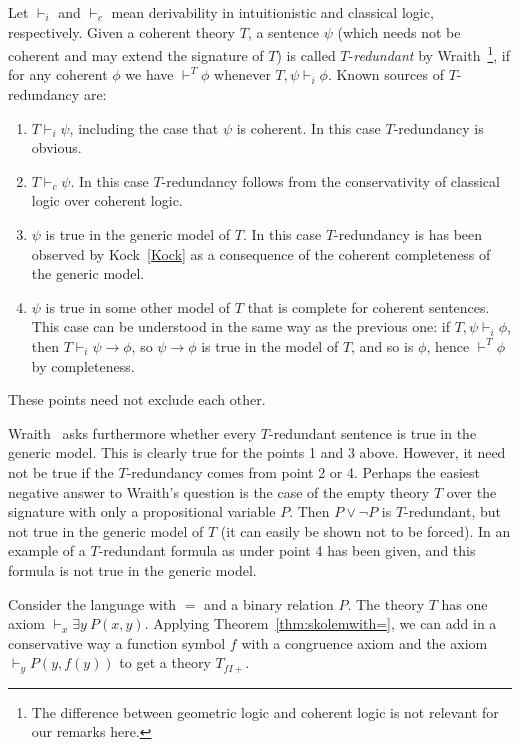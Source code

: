 \documentclass[10pt,a4paper]{article}
\begin{document}
Let $\vdash_i$ and $\vdash_c$ mean derivability in intuitionistic and classical logic,
respectively. Given a coherent theory $T$, a sentence $\psi$ 
(which needs not be coherent and may extend the signature of $T$)
is called $T$-\emph{redundant} by
Wraith~\cite[p. 336]{Wraith}\footnote{The difference
between geometric logic and coherent logic is not relevant for our remarks here.},
if for any coherent $\phi$ we have
$\vdash^T \phi$ whenever $T,\psi \vdash_i \phi$.
Known sources of $T$-redundancy are:
\begin{enumerate}
\item $T \vdash_i \psi$, including the case that $\psi$ is coherent.
In this case $T$-redundancy is obvious.
\item $T \vdash_c \psi$. In this case $T$-redundancy follows from the conservativity
of classical logic over coherent logic.
\item $\psi$ is true in the generic model of $T$. In this case $T$-redundancy is
has been observed by Kock~\ref{Kock} as a consequence of the coherent 
completeness of the generic model.
\item $\psi$ is true in some other model of $T$ that is complete for coherent 
sentences. This case can be understood in the same way as the previous one: 
if $T,\psi \vdash_i \phi$, then $T \vdash_i \psi\to\phi$, so $\psi\to\phi$ is true in
the model of $T$, and so is $\phi$, hence $\vdash^{T} \phi$ by completeness.
\end{enumerate}
These points need not exclude each other.

Wraith~\cite[p. 336]{Wraith} asks furthermore whether every $T$-redundant
sentence is true in the generic model. This is clearly true for the points 1 and 3 above.
However, it need not be true if the $T$-redundancy comes from point 2 or 4.
Perhaps the easiest negative answer to Wraith's question is the case of
the empty theory $T$ over the signature with only a propositional variable $P$.
Then $P\lor\neg P$ is $T$-redundant, but not true in the generic model of $T$
(it can easily be shown not to be forced). In \cite{BBC18} an example of
a $T$-redundant formula as under point 4 has been given, and this formula is
not true in the generic model.

Consider the language with $=$ and a binary relation $P$. The theory $T$ has one axiom
$\vdash_x \exists y~P(x,y)$. Applying Theorem~\ref{thm:skolemwith=}, we can add
in a conservative way a function symbol $f$ with a congruence axiom
and the axiom $\vdash _y P(y,f(y))$ to get a theory $T_{f\!I\!{+}}$.
\end{document}
